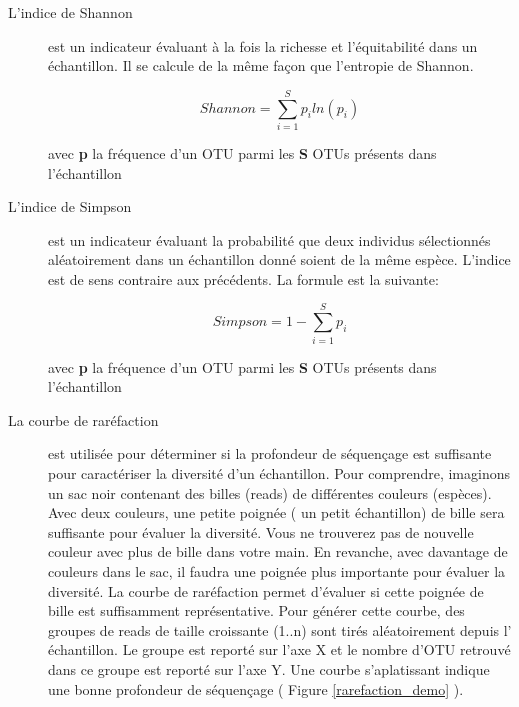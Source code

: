 \documentclass[12pt,a4paper]{article}
\begin{document}
\begin{description}
\item[L'indice de Shannon] est un indicateur évaluant à la fois la richesse et l'équitabilité dans un échantillon. Il se calcule de la même façon que l’entropie de Shannon.

\begin{mycapequ}[!h]
   \begin{equation}
     Shannon = \sum_{i=1}^Sp_{i}ln(p_{i})
   \end{equation}
      \caption{avec \textbf{p} la fréquence d'un OTU parmi les \textbf{S} OTUs présents dans l'échantillon}
\end{mycapequ}

\item[L'indice de Simpson] est un indicateur évaluant la probabilité que deux individus sélectionnés aléatoirement dans un échantillon donné soient de la même espèce. L'indice est de sens contraire aux précédents. La formule est la suivante:

\begin{mycapequ}[!h]
   \begin{equation}
     Simpson = 1 - \sum_{i=1}^Sp_{i}
   \end{equation}
      \caption{avec \textbf{p} la fréquence d'un OTU parmi les \textbf{S} OTUs présents dans l'échantillon}
\end{mycapequ}

\newpage

\item[La courbe de raréfaction] est utilisée pour déterminer si la profondeur de séquençage est suffisante pour caractériser la diversité d’un échantillon. Pour comprendre, imaginons un sac noir contenant des billes (reads) de différentes couleurs (espèces). Avec deux couleurs, une petite poignée ( un petit échantillon) de bille sera suffisante pour évaluer la diversité. Vous ne trouverez pas de nouvelle couleur avec plus de bille dans votre main. En revanche, avec davantage de couleurs dans le sac, il faudra une poignée plus importante pour évaluer la diversité. La courbe de raréfaction permet d'évaluer si cette poignée de bille est suffisamment représentative.
Pour générer cette courbe, des groupes de reads de taille croissante (1..n) sont tirés aléatoirement depuis l' échantillon. Le groupe est reporté sur l'axe X et le nombre d'OTU retrouvé dans ce groupe est reporté sur l’axe Y.
Une courbe s’aplatissant indique une bonne profondeur de séquençage ( Figure \ref{rarefaction_demo} ).
\end{description}
\end{document}
